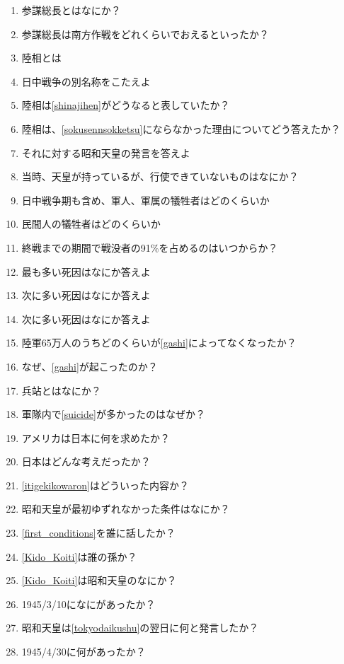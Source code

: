 \documentclass[]{jsarticle}
\begin{document}
\begin{enumerate}
	\item 参謀総長とはなにか？
	\item 参謀総長は南方作戦をどれくらいでおえるといったか？
	\item 陸相とは
	\item 日中戦争の別名称をこたえよ\label{shinajihen}
	\item 陸相は\ref{shinajihen}がどうなると表していたか？\label{sokusennsokketsu}
	\item 陸相は、\ref{sokusennsokketsu}にならなかった理由についてどう答えたか？
	\item それに対する昭和天皇の発言を答えよ
	\item 当時、天皇が持っているが、行使できていないものはなにか？
	\item 日中戦争期も含め、軍人、軍属の犠牲者はどのくらいか
	\item 民間人の犠牲者はどのくらいか
	\item 終戦までの期間で戦没者の91\%を占めるのはいつからか？
	\item 最も多い死因はなにか答えよ\label{gashi}
	\item 次に多い死因はなにか答えよ\label{disease}
	\item 次に多い死因はなにか答えよ\label{suicide}
	\item 陸軍65万人のうちどのくらいが\ref{gashi}によってなくなったか？
	\item なぜ、\ref{gashi}が起こったのか？
	\item 兵站とはなにか？
	\item 軍隊内で\ref{suicide}が多かったのはなぜか？
		\\
	\item アメリカは日本に何を求めたか？
	\item 日本はどんな考えだったか？\label{itigekikowaron}
	\item \ref{itigekikowaron}はどういった内容か？
		\\
	\item 昭和天皇が最初ゆずれなかった条件はなにか？\label{first_conditions}
	\item \ref{first_conditions}を誰に話したか？\label{Kido_Koiti}
	\item \ref{Kido_Koiti}は誰の孫か？
	\item \ref{Kido_Koiti}は昭和天皇のなにか？
	\item 1945/3/10になにがあったか？\label{tokyodaikushu}
	\item 昭和天皇は\ref{tokyodaikushu}の翌日に何と発言したか？
	\item 1945/4/30に何があったか？\label{hitlernojiketsu}

\end{enumerate}
\end{document}
